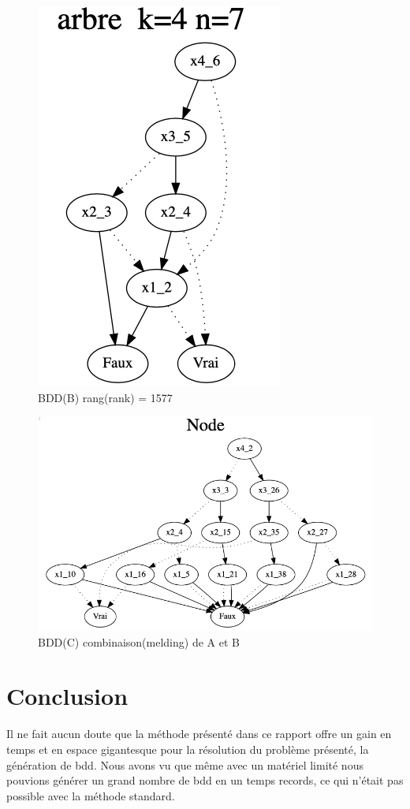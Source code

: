\documentclass[french]{article}
\begin{document}
\begin{figure}[h!]
    \centering
    \includegraphics[scale=0.4]{arb_1577.png}
    \caption{BDD(B) rang(rank) = 1577}
    \label{fig:graphe_B}
\end{figure}

\begin{figure}[h!]
    \centering
    \includegraphics[scale=0.4]{abr_melding_C.png}
    \caption{BDD(C) combinaison(melding) de A et B}
    \label{fig:graphe_C}
\end{figure}


\section{Conclusion}
Il ne fait aucun doute que la méthode présenté dans ce rapport offre un gain en temps et en espace gigantesque pour la résolution du problème présenté, la génération de bdd. Nous avons vu que même avec un matériel limité nous pouvions générer un grand nombre de bdd en un temps records, ce qui n'était pas possible avec la méthode standard. 
\end{document}
